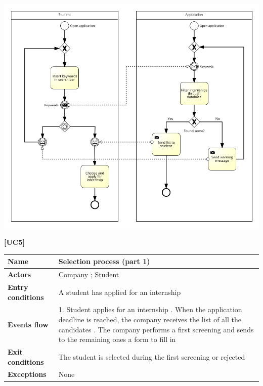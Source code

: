 \documentclass[11pt,twoside]{article}
\begin{document}
\begin{center}
\includegraphics[width=\textwidth]{Images/UC4}
\end{center}

\newpage

\large{\textbf{[UC5]}}
\begin{table}[H]
\begin{tabular}{| p{} | p{} |}
\hline
\textbf{Name}
& Selection process (part 1) \\
\hline
\textbf{Actors}
& Company ; Student \\
\hline
\textbf{Entry conditions}
& A student has applied for an internship \\
\hline
\textbf{Events flow}
& 1. Student applies for an internship \newline
2. When the application deadline is reached, the company receives the list of all the candidates \newline
3. The company performs a first screening and sends to the remaining ones a form to fill in \\
\hline
\textbf{Exit conditions}
& The student is selected during the first screening or rejected \\
\hline
\textbf{Exceptions}
& None \\
\hline
\end{tabular}
\end{table}
\end{document}
